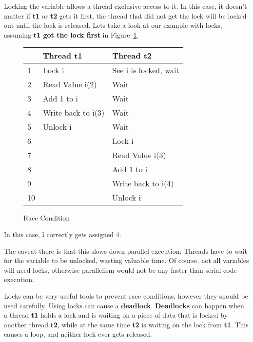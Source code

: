 \documentclass[letterpaper, 12pt]{article}
\begin{document}
Locking the variable allows a thread exclusive access to it. In this case, it doesn't
matter if {\bfseries t1} or {\bfseries t2} gets it first, the thread that did
not get the lock will be locked out until the lock is released. Lets take a
look at our example with locks, assuming {\bfseries t1 got the lock first} in 
Figure~\ref{fig:race_cond_4}.

\begin{figure}[h]
\centering
\begin{tabular}{|l|l|l|}
	\hline
	& {\bfseries Thread t1} & {\bfseries Thread t2} \\
	\hline
	1 & Lock i & See i is locked, wait \\
	\hline
	2 & Read Value i(2) & Wait\\
	\hline
	3 & Add 1 to i & Wait \\
	\hline
	4 & Write back to i(3) & Wait \\
	\hline
	5 & Unlock i & Wait \\
	\hline
	6 &  & Lock i \\
	\hline
	7 & & Read Value i(3)\\
	\hline
	8 & & Add 1 to i \\
	\hline
	9 & & Write back to i(4) \\
	\hline
	10 & & Unlock i\\
	\hline
\end{tabular}
\caption{Race Condition}
\label{fig:race_cond_4}
\end{figure}

In this case, {\bfseries i} correctly gets assigned 4.
\par\vspace{\baselineskip}

The caveat there is that this slows down parallel execution. Threads have to wait for
the variable to be unlocked, wasting valuable time. Of course, not all variables
will need locks, otherwise parallelism would not be any faster than serial code execution.
\par\vspace{\baselineskip}

Locks can be very useful tools to prevent race conditions, however they should be used carefully.
Using locks can cause a {\bfseries deadlock}. {\bfseries Deadlocks} can happen when a thread
{\bfseries t1} holds a lock and is waiting on a piece of data that is locked by another thread
{\bfseries t2}, while at the same time {\bfseries t2} is waiting on the lock from {\bfseries t1}.
This causes a loop, and neither lock ever gets released.
\par\vspace{\baselineskip}
\end{document}
